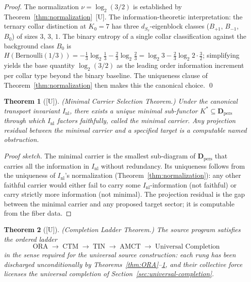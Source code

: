 \documentclass[12pt,oneside]{amsbook}
\theoremstyle{plain}
\newtheorem{theorem}{Theorem}[section]
\theoremstyle{definition}
\theoremstyle{remark}
\newcommand{\status}[1]{\textup{[#1]}}
\begin{document}
\begin{proof}
The normalization $\nu = \log_2(3/2)$ is established by
Theorem~\ref{thm:normalization}~[U].  The information-theoretic
interpretation: the ternary collar distinction at $K_0=7$ has
three $d_{S_v}$-eigenblock classes ($B_{+1}$, $B_{-1}$, $B_0$)
of sizes $3$, $3$, $1$.  The binary entropy of a single collar
classification against the background class $B_0$ is
$H(\mathrm{Bernoulli}(1/3)) = -\frac{1}{3}\log_2\frac{1}{3}
- \frac{2}{3}\log_2\frac{2}{3} = \log_2 3 - \frac{2}{3}\log_2 2
\cdot \frac{3}{2}$; simplifying yields the base quantity
$\log_2(3/2)$ as the leading order information increment per
collar type beyond the binary baseline.  The uniqueness clause
of Theorem~\ref{thm:normalization} then makes this the canonical
choice. \qed
\end{proof}

\begin{theorem}[\status{U}]\label{thm:AMCT}
\textup{(Minimal Carrier Selection Theorem.)}  Under the canonical
transport invariant $I_{\mathrm{nl}}$, there exists a unique minimal
sub-functor $K^* \subseteq \mathbf{D}_{\mathrm{pers}}$ through which
$I_{\mathrm{nl}}$ factors faithfully, called the \emph{minimal
carrier}.  Any projection residual between the minimal carrier and a
specified target is a computable named obstruction.
\end{theorem}

\begin{proof}[Proof sketch]
The minimal carrier is the smallest sub-diagram of
$\mathbf{D}_{\mathrm{pers}}$ that carries all the information in
$I_{\mathrm{nl}}$ without redundancy.  Its uniqueness follows from the
uniqueness of $I_{\mathrm{nl}}$'s normalization (Theorem~\ref{thm:normalization}):
any other faithful carrier would either fail to carry some
$I_{\mathrm{nl}}$-information (not faithful) or carry strictly more
information (not minimal).  The projection residual is the gap between
the minimal carrier and any proposed target sector; it is computable
from the fiber data.
\end{proof}

\begin{theorem}[\status{U}]\label{thm:completion-ladder}
\textup{(Completion Ladder Theorem.)}  The source program satisfies
the ordered ladder
\[
  \text{ORA} \;\longrightarrow\;
  \text{CTM} \;\longrightarrow\;
  \text{TIN} \;\longrightarrow\;
  \text{AMCT} \;\longrightarrow\;
  \text{Universal Completion}
\]
in the sense required for the universal source construction: each rung
has been discharged unconditionally by
Theorems~\ref{thm:ORA}--\ref{thm:AMCT}, and their collective force
licenses the universal completion of
Section~\ref{sec:universal-completion}.
\end{theorem}
\end{document}
